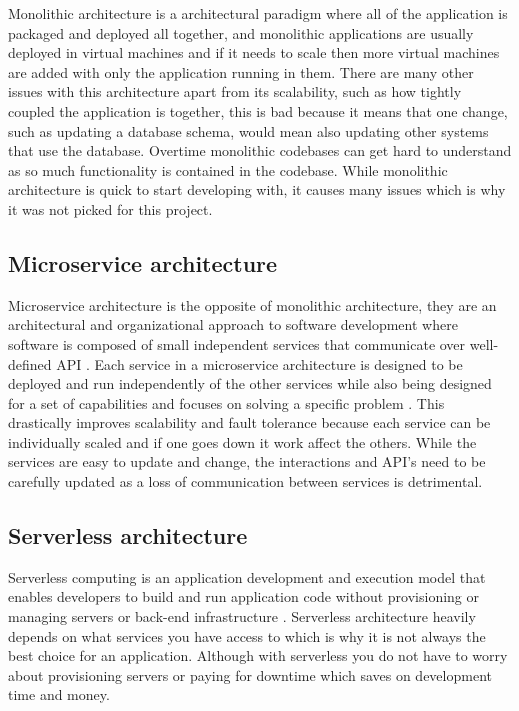 \documentclass[]{project_report}
\begin{document}
Monolithic architecture is a architectural paradigm where all of the application is packaged and deployed all together, and monolithic applications are usually deployed in virtual machines and if it needs to scale then more virtual machines are added with only the application running in them. There are many other issues with this architecture apart from its scalability, such as how tightly coupled the application is together, this is bad because it means that one change, such as updating a database schema, would mean also updating other systems that use the database. Overtime monolithic codebases can get hard to understand as so much functionality is contained in the codebase. While monolithic architecture is quick to start developing with, it causes many issues which is why it was not picked for this project.

\subsection{Microservice architecture}

Microservice architecture is the opposite of monolithic architecture, they are an architectural and organizational approach to software development where software is composed of small independent services that communicate over well-defined API \cite{aws_microservices}. Each service in a microservice architecture is designed to be deployed and run independently of the other services while also being designed for a set of capabilities and focuses on solving a specific problem \cite{aws_microservices}. This drastically improves scalability and fault tolerance because each service can be individually scaled and if one goes down it work affect the others. While the services are easy to update and change, the interactions and API's need to be carefully updated as a loss of communication between services is detrimental.

\subsection{Serverless architecture}

Serverless computing is an application development and execution model that enables developers to build and run application code without provisioning or managing servers or back-end infrastructure \cite{ibm_serverless}. Serverless architecture heavily depends on what services you have access to which is why it is not always the best choice for an application. Although with serverless you do not have to worry about provisioning servers or paying for downtime which saves on development time and money.
\end{document}
